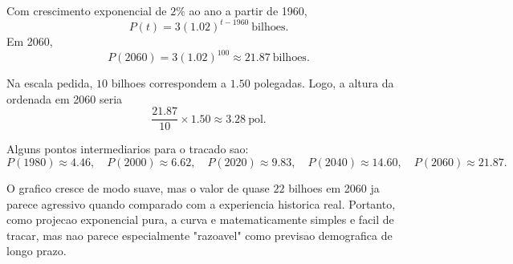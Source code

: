 Com crescimento exponencial de $2\%$ ao ano a partir de 1960,
\[
P(t)=3(1.02)^{t-1960}\ \text{bilhoes}.
\]
Em 2060,
\[
P(2060)=3(1.02)^{100}\approx 21.87\ \text{bilhoes}.
\]

Na escala pedida, $10$ bilhoes correspondem a $1.50$ polegadas. Logo, a altura da ordenada em 2060 seria
\[
\frac{21.87}{10}\times 1.50\approx 3.28\ \text{pol}.
\]

Alguns pontos intermediarios para o tracado sao:
\[
P(1980)\approx 4.46,
\quad
P(2000)\approx 6.62,
\quad
P(2020)\approx 9.83,
\quad
P(2040)\approx 14.60,
\quad
P(2060)\approx 21.87.
\]

O grafico cresce de modo suave, mas o valor de quase $22$ bilhoes em 2060 ja parece agressivo quando comparado com a experiencia historica real. Portanto, como projecao exponencial pura, a curva e matematicamente simples e facil de tracar, mas nao parece especialmente "razoavel" como previsao demografica de longo prazo.